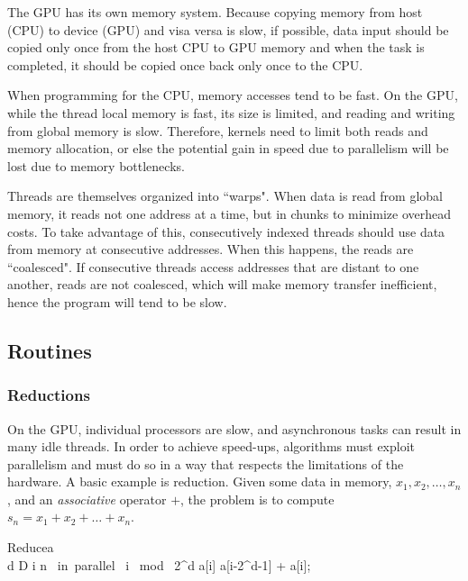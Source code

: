 The GPU has its own memory system. Because copying memory from host (CPU) to device (GPU) and visa versa is slow, if possible, data input should be copied only once from the host CPU to GPU memory and when the task is completed, it should be copied once back only once to the CPU.

When programming for the CPU, memory accesses tend to be fast. On the GPU, while the thread local memory is fast, its size is limited, and reading and writing from global memory is slow. Therefore, kernels need to limit both reads and memory allocation, or else the potential gain in speed due to parallelism will be lost due to memory bottlenecks.

Threads are themselves organized into ``warps". When data is read from global memory, it reads not one address at a time, but in chunks to minimize overhead costs. To take advantage of this, consecutively indexed threads should use data from memory at consecutive addresses. When this happens, the reads are ``coalesced". If consecutive threads access addresses that are distant to one another, reads are not coalesced, which will make memory transfer inefficient, hence the program will tend to be slow.

\subsection{Routines}
\label{sec:routines}
\subsubsection{Reductions}
\label{subsec:reduce}
On the GPU, individual processors are slow, and asynchronous tasks can result in many idle threads. In order to achieve speed-ups, algorithms must exploit parallelism and must do so in a way that respects the limitations of the hardware. A basic example is reduction. Given some data in memory, $x_1, x_2, \ldots, x_n$, and an \textit{associative} operator $+$, the problem is to compute $s_n=x_1 + x_2 + \ldots + x_n$. 

\begin{pseudocode}[ruled]{Reduce}{a}
\label{upsweep}
\\
\FOR d  \TO D \DO \BEGIN
  \FOR i  \TO n \mbox{ in parallel }\DO \BEGIN
    \IF i \mbox{ mod } 2^d \DO \BEGIN
    a[i] \GETS a[i-2^{d-1}] + a[i];\\
    \END \END \END
{}
\end{pseudocode}

